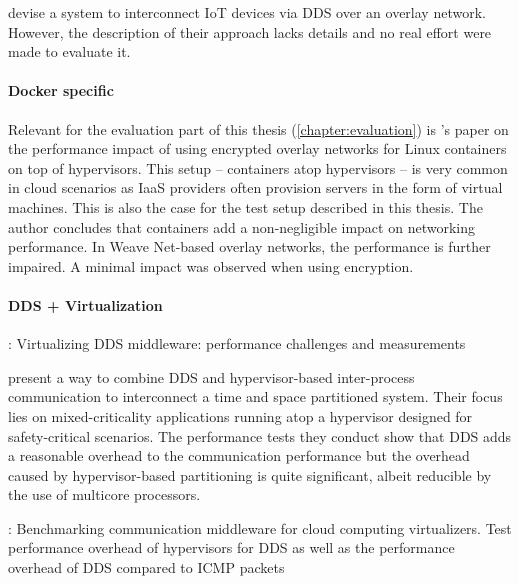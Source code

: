 \citeauthor*{hakiri2015publish} \cite{hakiri2015publish} devise a system to interconnect IoT devices via DDS over an overlay network. However, the description of their approach lacks details and no real effort were made to evaluate it.



\paragraph{Docker specific}

Relevant for the evaluation part of this thesis (\autoref{chapter:evaluation}) is \citeauthor*{kratzke2017microservices}'s paper \cite{kratzke2017microservices} on the performance impact of using encrypted overlay networks for Linux containers on top of hypervisors. This setup -- containers atop hypervisors -- is very common in cloud scenarios as IaaS providers often provision servers in the form of virtual machines. This is also the case for the test setup described in this thesis. The author concludes that containers add a non-negligible impact on networking performance. In Weave Net-based overlay networks, the performance is further impaired. A minimal impact was observed when using encryption.



\paragraph{DDS + Virtualization}
\cite{serrano2013virtualizing}: Virtualizing DDS middleware: performance challenges and measurements

\citeauthor*{perez:gutierrez:ieeetpds16} \cite{perez:gutierrez:ieeetpds16} present a way to combine DDS and hypervisor-based inter-process communication to interconnect a time and space partitioned system. Their focus lies on mixed-criticality applications running atop a hypervisor designed for safety-critical scenarios. The performance tests they conduct show that DDS adds a reasonable overhead to the communication performance but the overhead caused by hypervisor-based partitioning is quite significant, albeit reducible by the use of multicore processors.

\cite{garcia2013benchmarking}: Benchmarking communication middleware for cloud computing virtualizers. Test performance overhead of hypervisors for DDS as well as the performance overhead of DDS compared to ICMP packets

